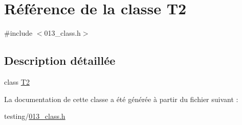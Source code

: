 \hypertarget{class_t2}{}\section{Référence de la classe T2}
\label{class_t2}


{\ttfamily \#include $<$013\+\_\+class.\+h$>$}



\subsection{Description détaillée}
class \hyperlink{class_t2}{T2} 

La documentation de cette classe a été générée à partir du fichier suivant \+:\begin{DoxyCompactItemize}
\item 
testing/\hyperlink{013__class_8h}{013\+\_\+class.\+h}\end{DoxyCompactItemize}
